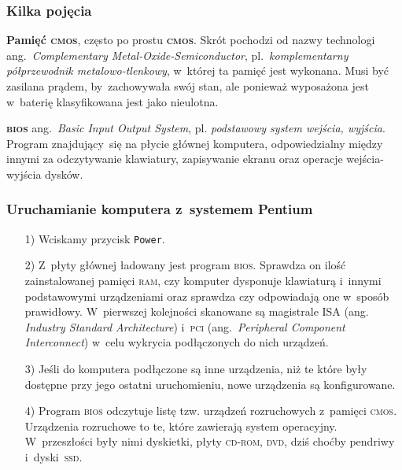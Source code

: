 \documentclass[10pt,t]{beamer}
\begin{document}
\begin{frame}
  \frametitle{Kilka pojęcia}


  \textbf{Pamięć \textsc{cmos}}, często po prostu \textbf{\textsc{cmos}}.
  Skrót pochodzi od nazwy technologi ang.~\textit{Complementary
    Metal-Oxide-Semiconductor}, pl.~\textit{komplementarny półprzewodnik
    metalowo-tlenkowy}, w~której ta pamięć jest wykonana. Musi być zasilana
  prądem, by~zachowywała swój stan, ale ponieważ wyposażona jest w~baterię
  klasyfikowana jest jako nieulotna.

  \textbf{\textsc{bios}} ang.~\textit{Basic Input Output System}, pl.
  \textit{podstawowy system wejścia, wyjścia}. Program znajdujący~się
  na płycie głównej komputera, odpowiedzialny między innymi za odczytywanie
  klawiatury, zapisywanie ekranu oraz operacje wejścia-wyjścia dysków.

\end{frame}





\begin{frame}
  \frametitle{Uruchamianie komputera z~systemem Pentium}


  \begin{itemize}

  \item[1)] Wciskamy przycisk \texttt{Power}.



  \item[2)] Z~płyty głównej ładowany jest program \textsc{bios}. Sprawdza on
    ilość zainstalowanej pamięci \textsc{ram}, czy komputer dysponuje
    klawiaturą i~innymi podstawowymi urządzeniami oraz sprawdza czy
    odpowiadają one w~sposób prawidłowy. W~pierwszej kolejności skanowane
    są magistrale \textsc{ISA} (ang. \textit{Industry Standard
      Architecture}) i~\textsc{pci} (ang.~\textit{Peripheral Component
      Interconnect}) w~celu wykrycia podłączonych do nich urządzeń.



  \item[3)] Jeśli do komputera podłączone są inne urządzenia, niż te które
    były dostępne przy jego ostatni uruchomieniu, nowe urządzenia są
    konfigurowane.



  \item[4)] Program \textsc{bios} odczytuje listę tzw. urządzeń rozruchowych
    z~pamięci \textsc{cmos}. Urządzenia rozruchowe to te, które zawierają
    system operacyjny. W~przeszłości były nimi dyskietki, płyty
    \textsc{cd}-\textsc{rom}, \textsc{dvd}, dziś choćby pendriwy
    i~dyski~\textsc{ssd}.

  \end{itemize}

\end{frame}
\end{document}
